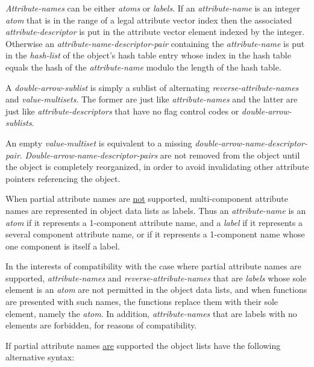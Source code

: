 \documentclass[12pt]{article}
\begin{document}
{\em Attribute-names} can be either {\em atoms} or {\em labels}.
If an {\em attribute-name} is an integer {\em atom}
that is in the range of a legal
attribute vector index then the associated
{\em attribute-descriptor} is put in the attribute vector element
indexed by the integer.
Otherwise an {\em attribute-name-descriptor-pair} containing
the {\em attribute-name} is put
in the {\em hash-list} of the object's hash table entry whose index
in the hash table
equals the hash of the {\em attribute-name} modulo the length of the
hash table.

A {\em double-arrow-sublist} is 
simply a sublist of alternating {\em reverse-attribute-names}
and {\em value-multisets}.  The former are just like {\em attribute-names}
and the latter are just like {\em attribute-descriptors} that have no
flag control codes or {\em double-arrow-sublists}.

An empty {\em value-multiset} is equivalent to a missing
{\em double-arrow-name-descriptor-pair}.
{\em Dou\-ble-arrow-name-descriptor-pairs} are not
removed from the object until the object is completely reorganized,
in order to avoid invalidating other attribute pointers referencing the object.

When partial attribute names are \underline{not} supported, multi-component
attribute names are represented in object data lists as labels.
Thus an {\em attribute-name} is an {\em atom} if it represents a 1-component
attribute name, and a {\em label} if it represents a several component
attribute name, or if it represents a 1-component name whose one component
is itself a label.

In the interests of compatibility with the case where partial attribute
names are supported, {\em attribute-names} and {\em reverse-attribute-names}
that are {\em labels} whose sole element is an {\em atom} are not
permitted in the object data lists, and when functions are presented with
such names, the functions replace them with their sole element, namely the
{\em atom}.  In addition, {\em attribute-names} that are labels with no elements
are forbidden, for reasons of compatibility.

If partial attribute names \underline{are} supported
the object lists have the following alternative syntax:
\end{document}
